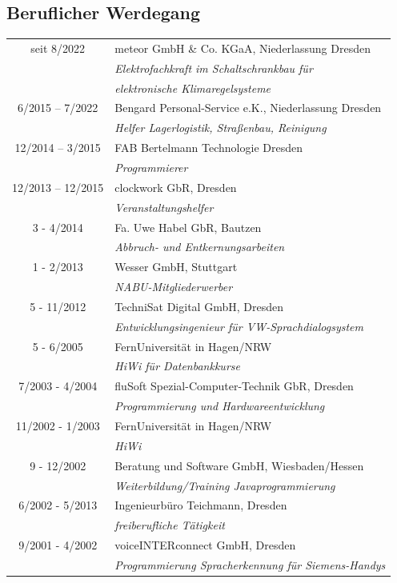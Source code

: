 \documentclass{article}
\begin{document}
\subsection*{Beruflicher Werdegang}
\begin{tabular}{cp{15cm}}
seit 8/2022     		&   	meteor GmbH \& Co. KGaA, Niederlassung Dresden \\
                        		&   	\it{Elektrofachkraft im Schaltschrankbau f\"ur } \\
                        		&   	\it{elektronische Klimaregelsysteme}\\
                        
6/2015 -- 7/2022	& 	Bengard Personal-Service e.K., Niederlassung Dresden\\
	    			& 	\it{Helfer Lagerlogistik, Stra\ss{}enbau, Reinigung}\\
12/2014  --  3/2015 	& FAB Bertelmann Technologie Dresden\\
		  		& \it{Programmierer}\\
12/2013  --  12/2015 	& clockwork GbR, Dresden\\
		   		& \it{Veranstaltungshelfer}\\
3 - 4/2014			& Fa. Uwe Habel GbR, Bautzen\\
				& \it{Abbruch- und Entkernungsarbeiten}\\
1 - 2/2013			& Wesser GmbH, Stuttgart\\
				& \it{NABU-Mitgliederwerber}\\
5 - 11/2012		& TechniSat Digital GmbH, Dresden\\
				& \it{Entwicklungsingenieur für VW-Sprachdialogsystem}\\
5 - 6/2005			& FernUniversit\"at in Hagen/NRW\\
				& \it{HiWi für Datenbankkurse}\\
7/2003 - 4/2004		& fluSoft Spezial-Computer-Technik GbR, Dresden\\
				& \it{Programmierung und Hardwareentwicklung}\\
11/2002 - 1/2003	& FernUniversit\"at in Hagen/NRW\\
				& \it{HiWi}\\
9 - 12/2002		& Beratung und Software GmbH, Wiesbaden/Hessen\\
				& \it{Weiterbildung/Training Javaprogrammierung}\\
6/2002 - 5/2013		& Ingenieurb\"uro Teichmann, Dresden\\
				& \it{freiberufliche T\"atigkeit}\\
9/2001 - 4/2002		& voiceINTERconnect GmbH, Dresden\\
				& \it{Programmierung Spracherkennung für Siemens-Handys}\\
\end{tabular}
\end{document}
